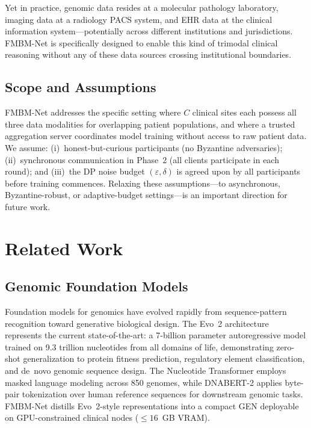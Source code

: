 \documentclass[a4paper,fleqn]{cas-dc}
\begin{document}
Yet in practice, genomic data resides at a molecular pathology laboratory, imaging data at a radiology PACS system, and EHR data at the clinical information system---potentially across different institutions and jurisdictions. FMBM-Net is specifically designed to enable this kind of trimodal clinical reasoning without any of these data sources crossing institutional boundaries.

\subsection{Scope and Assumptions}

FMBM-Net addresses the specific setting where $C$ clinical sites each possess all three data modalities for overlapping patient populations, and where a trusted aggregation server coordinates model training without access to raw
patient data. We assume: (i)~honest-but-curious participants (no Byzantine
adversaries); (ii)~synchronous communication in Phase~2 (all clients
participate in each round); and (iii)~the DP noise budget $(\varepsilon,\delta)$
is agreed upon by all participants before training commences. Relaxing these assumptions---to asynchronous, Byzantine-robust, or adaptive-budget settings---is an important direction for future work.

\section{Related Work}
\label{sec:related}

\subsection{Genomic Foundation Models}

Foundation models for genomics have evolved rapidly from sequence-pattern recognition toward generative biological design.
The Evo~2 architecture \citep{evo2_2026} represents the current
state-of-the-art: a 7-billion parameter autoregressive model trained on 9.3 trillion nucleotides from all domains of life, demonstrating zero-shot generalization to protein fitness prediction, regulatory element classification, and de~novo genomic sequence design. The Nucleotide Transformer \citep{nucleotide_transformer_2023} employs masked language modeling
across 850 genomes, while DNABERT-2 \citep{zhou2024dnabert2} applies byte-pair tokenization over human reference sequences for downstream genomic tasks. FMBM-Net distills Evo~2-style representations into a compact GEN deployable on GPU-constrained clinical nodes ($\leq\!16$~GB VRAM).
\end{document}
